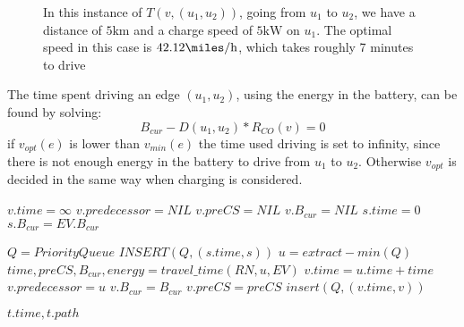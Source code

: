 \begin{figure}[!htb]
\label{fig:graph}
% 
\caption{In this instance of $T(v,(u_1, u_2))$, going from $u_1$ to $u_2$, we have a distance of $5 \si{\km}$ and a charge speed of $5 \si{\kW}$ on $u_1$. The optimal speed in this case is $42.12\si{\miles\per\hour}$, which takes roughly 7 minutes to drive}
\end{figure}

The time spent driving an edge $(u_1, u_2)$, using the energy in the battery, can be found by solving:
\[B_{cur} - D(u_1, u_2) * R_{CO}(v) = 0\] 
if $v_{opt}(e)$ is lower than $v_{min}(e)$ the time used driving is set to infinity, since there is not enough energy in the battery to drive from $u_1$ to $u_2$. Otherwise $v_{opt}$ is decided in the same way when charging is considered.


\begin{algorithmic}
		\State $v.time = \infty$
		\State $v.predecessor = NIL$
		\State $v.preCS = NIL$
		\State $v.B_{cur} = NIL$
	\EndFor
	\State $s.time = 0$
	\State $s.B_{cur} = EV.B_{cur}$

	\State $Q = PriorityQueue$
	\State $INSERT(Q, (s.time, s))$	
		\State $u = extract-min(Q)$
			\State $time,preCS,B_{cur},energy = travel\_time(RN, u, EV)$
				\State $v.time = u.time + time$
				\State $v.predecessor = u$
				\State $v.B_{cur} = B_{cur}$
				\State $v.preCS = preCS$
				\State $insert(Q, (v.time, v))$	
			\EndIf

		\EndFor
	\EndWhile
	\State \Return $t.time, t.path$
\EndFunction
\end{algorithmic}\label{alg:fastest_path}
